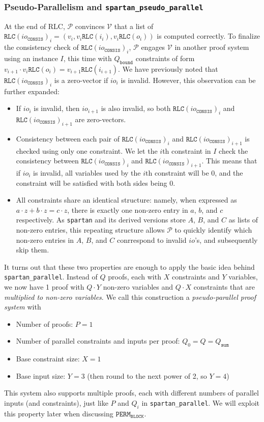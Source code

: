 \documentclass{article}
\newcommand{\code}{\texttt}
\newcommand{\Qbound}{Q_{\mathtt{bound}}}
\newcommand{\Qsum}{Q_{\mathtt{sum}}}
\renewcommand{\P}{\mathcal{P}}
\newcommand{\V}{\mathcal{V}}
\newcommand{\RLC}{\mathtt{RLC}}
\newcommand{\ioc}{io_{\mathtt{CONSIS}}}
\newcommand{\PERMB}{\mathtt{PERM_{BLOCK}}}
\begin{document}
\subsubsection{Pseudo-Parallelism and \code{spartan\_pseudo\_parallel}}

At the end of RLC, $\P$ convinces $\V$ that a list of $\RLC(\ioc)_i = (v_i, v_i\RLC(i_i), v_i\RLC(o_i))$ is computed correctly. To finalize the consistency check of $\RLC(\ioc)_i$, $\P$ engages $\V$ in another proof system using an instance $I$, this time with $\Qbound$ constraints of form $v_{i+1}\cdot v_i\RLC(o_i) = v_{i+1}\RLC(i_{i+1})$. We have previously noted that $\RLC(\ioc)_i$ is a zero-vector if $io_i$ is invalid. However, this observation can be further expanded:
\begin{itemize}
    \item If $io_i$ is invalid, then $io_{i+1}$ is also invalid, so both $\RLC(\ioc)_i$ and $\RLC(\ioc)_{i+1}$ are zero-vectors.
    \item Consistency between each pair of $\RLC(\ioc)_i$ and $\RLC(\ioc)_{i+1}$ is checked using only one constraint. We let the $i$th constraint in $I$ check the consistency between $\RLC(\ioc)_i$ and $\RLC(\ioc)_{i+1}$. This means that if $io_i$ is invalid, all variables used by the $i$th constraint will be 0, and the constraint will be satisfied with both sides being 0.
    \item All constraints share an identical structure: namely, when expressed as $a\cdot z + b\cdot z = c\cdot z$, there is exactly one non-zero entry in $a$, $b$, and $c$ respectively. As \code{spartan} and its derived versions store $A$, $B$, and $C$ as lists of non-zero entries, this repeating structure allows $\P$ to quickly identify which non-zero entries in $A$, $B$, and $C$ conrrespond to invalid $io$'s, and subsequently skip them.
\end{itemize}
It turns out that these two properties are enough to apply the basic idea behind \code{spartan\_parallel}. Instead of $Q$ proofs, each with $X$ constraints and $Y$ variables, we now have 1 proof with $Q\cdot Y$ non-zero variables and $Q\cdot X$ constraints that are \emph{multiplied to non-zero variables}. We call this construction a \emph{pseudo-parallel proof system} with
\begin{itemize}
    \item Number of proofs: $P = 1$
    \item Number of parallel constraints and inputs per proof: $Q_0 = Q = \Qsum$
    \item Base constraint size: $X = 1$
    \item Base input size: $Y = 3$ (then round to the next power of 2, so $Y = 4$)
\end{itemize}
This system also supports multiple proofs, each with different numbers of parallel inputs (and constraints), just like $P$ and $Q_i$ in \code{spartan\_parallel}. We will exploit this property later when discussing $\PERMB$.
\end{document}
